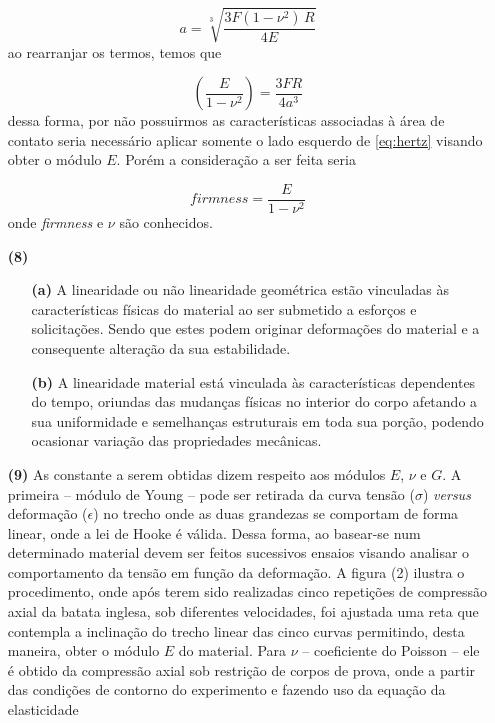 \documentclass[a4paper, 12pt, brazilian]{article}
\begin{document}
\begin{itemize}
		\begin{equation}
			a=\sqrt[3]{\dfrac{3F(1-\nu^{2})\,R}{4E}}
		\end{equation}
		ao rearranjar os termos, temos que
		
		\begin{equation}
			\label{eq:hertz}
			\left(\dfrac{E}{1-\nu^{2}}\right)=\dfrac{3FR}{4a^{3}}
		\end{equation}
		dessa forma, por não possuirmos as características associadas à área de contato seria necessário aplicar somente o lado esquerdo de \eqref{eq:hertz} visando obter o módulo $E$. Porém a consideração a ser feita seria
		
		\begin{equation}
			\textit{firmness}=\dfrac{E}{1-\nu^{2}}
		\end{equation}
		onde \textit{firmness} e $\nu$ são conhecidos.
	
		\item[\textbf{(8)}]		
		
		\begin{itemize}
			\item[\textbf{(a)}] A linearidade ou não linearidade geométrica estão vinculadas às características físicas do material ao ser submetido a esforços e solicitações. Sendo que estes podem originar deformações do material e a consequente alteração da sua estabilidade.
			\item[\textbf{(b)}] A linearidade material está vinculada às características dependentes do tempo, oriundas das mudanças físicas no interior do corpo afetando a sua uniformidade e semelhanças estruturais em toda sua porção, podendo ocasionar variação das propriedades mecânicas.
		\end{itemize}
	
		\item[\textbf{(9)}] As constante a serem obtidas dizem respeito aos módulos $E$, $\nu$ e $G$. A primeira -- módulo de Young -- pode ser retirada da curva tensão ($\sigma$) \textit{versus} deformação ($\epsilon$) no trecho onde as duas grandezas se comportam de forma linear, onde a lei de Hooke é válida. Dessa forma, ao basear-se num determinado material devem ser feitos sucessivos ensaios visando analisar o comportamento da tensão em função da deformação. A figura (2) ilustra o procedimento, onde após terem sido realizadas cinco repetições de compressão axial da batata inglesa, sob diferentes velocidades, foi ajustada uma reta que contempla a inclinação do trecho linear das cinco curvas permitindo, desta maneira, obter o módulo $E$ do material. Para $\nu$ -- coeficiente do Poisson -- ele é obtido da compressão axial sob restrição de corpos de prova, onde a partir das condições de contorno do experimento e fazendo uso da equação da elasticidade 
		

\end{itemize}
\end{document}
